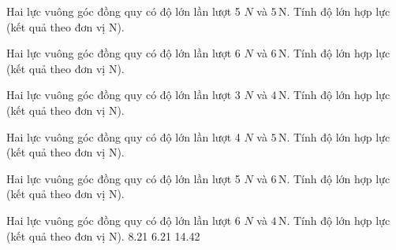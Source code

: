 \begin{bt}
Hai lực vuông góc đồng quy có độ lớn lần lượt 5 $N$ và $5\,\text{N}$. Tính độ lớn hợp lực (kết quả theo đơn vị N).
\end{bt}

\begin{bt}
Hai lực vuông góc đồng quy có độ lớn lần lượt 6 $N$ và $6\,\text{N}$. Tính độ lớn hợp lực (kết quả theo đơn vị N).
\end{bt}

\begin{bt}
Hai lực vuông góc đồng quy có độ lớn lần lượt 3 $N$ và $4\,\text{N}$. Tính độ lớn hợp lực (kết quả theo đơn vị N).
\end{bt}

\begin{bt}
Hai lực vuông góc đồng quy có độ lớn lần lượt 4 $N$ và $5\,\text{N}$. Tính độ lớn hợp lực (kết quả theo đơn vị N).
\end{bt}

\begin{bt}
Hai lực vuông góc đồng quy có độ lớn lần lượt 5 $N$ và $6\,\text{N}$. Tính độ lớn hợp lực (kết quả theo đơn vị N).
\end{bt}

\begin{ex}
Hai lực vuông góc đồng quy có độ lớn lần lượt 6 $N$ và $4\,\text{N}$. Tính độ lớn hợp lực (kết quả theo đơn vị N).
\choice
{}
{8.21}
{6.21}
{14.42}
\end{ex}

